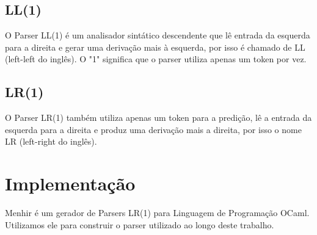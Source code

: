\documentclass[12pt,a4paper,twoside]{report}
\begin{document}
 \subsection{LL(1)}
 O Parser LL(1) é um analisador sintático descendente que lê entrada da esquerda para a direita e gerar uma derivação mais à esquerda, por isso é chamado de LL (left-left do inglês). O "1" significa que o parser utiliza apenas um token por vez.
 \subsection{LR(1)}
 O Parser LR(1) também utiliza apenas um token para a predição, lê a entrada da esquerda para a direita e produz uma derivação mais a direita, por isso o nome LR (left-right do inglês).
\section{Implementação}
 Menhir é um gerador de Parsers LR(1) para Linguagem de Programação OCaml. Utilizamos ele para construir o parser utilizado ao longo deste trabalho.
\end{document}

